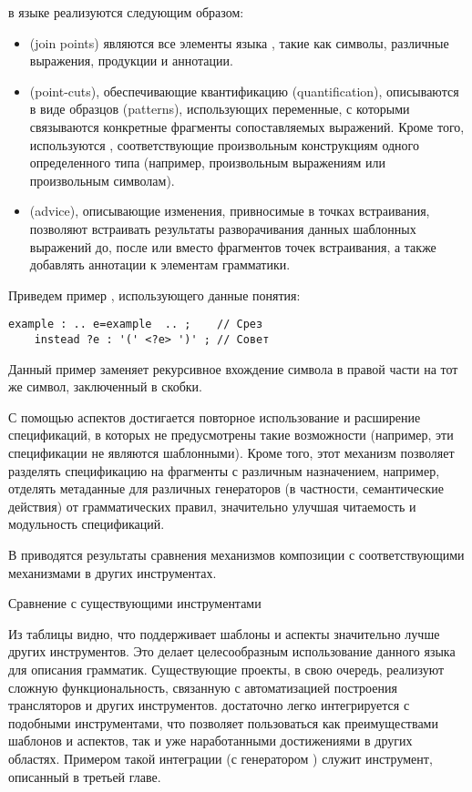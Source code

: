  в языке \GRM{} реализуются следующим образом:
\begin{itemize}
\item {} (join points) являются все элементы языка \GRM{}, такие как символы, различные выражения, продукции и аннотации.
\item {} (point-cuts), обеспечивающие квантификацию (quantification), описываются в виде образцов (patterns), использующих переменные, с которыми связываются конкретные фрагменты сопоставляемых выражений. Кроме того, используются , соответствующие произвольным конструкциям одного определенного типа (например, произвольным выражениям или произвольным символам).
\item {} (advice), описывающие изменения, привносимые в точках встраивания, позволяют встраивать результаты разворачивания данных шаблонных выражений до, после или вместо фрагментов точек встраивания, а также добавлять аннотации к элементам грамматики.
\end{itemize}
Приведем пример , использующего данные понятия:
\begin{lstlisting}
example : .. e=example  .. ;    // Срез
	instead ?e : '(' <?e> ')' ; // Совет
\end{lstlisting}
Данный пример заменяет рекурсивное вхождение символа  в правой части на тот же символ, заключенный в скобки.

С помощью аспектов достигается повторное использование  и расширение спецификаций, в которых не предусмотрены такие возможности (например, эти спецификации не являются шаблонными). Кроме того, этот механизм позволяет разделять спецификацию на фрагменты с различным назначением, например, отделять метаданные для различных генераторов (в частности, семантические действия) от грамматических правил, значительно улучшая читаемость и модульность спецификаций.

В  приводятся результаты сравнения механизмов композиции \GRM{} с соответствующими механизмами в других инструментах.
\begin{table}[htb]
	\centering
\newcommand{\dissonly}[1]{}

	\caption{Сравнение \GRM{} с существующими инструментами}\label{GrmTable}
\end{table}
Из таблицы видно, что \GRM{} поддерживает шаблоны и аспекты значительно лучше других инструментов. Это делает целесообразным использование данного языка для описания грамматик. Существующие проекты, в свою очередь, реализуют сложную функциональность, связанную с автоматизацией построения трансляторов и других инструментов. \GRM{} достаточно легко интегрируется с подобными инструментами, что позволяет пользоваться как преимуществами шаблонов и аспектов, так и уже наработанными достижениями в других областях. Примером такой интеграции (с генератором ) служит инструмент, описанный в третьей главе.

